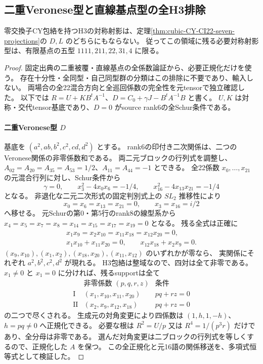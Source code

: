 \subsection{二重Veronese型と直線基点型の全H3排除}
\label{subsec:cubic-CY-DL-cover}
\begin{theorem}\label{thm:cubic-CY-DL-cover-empty}
零交換子CY包絡を持つH3の対称射影は、定理\ref{thm:cubic-CY-CI22-seven-projections}の
$D,L$ のどちらにもならない。
従ってこの領域に残る必要対称射影型は、有限基点の五型 $1111,211,22,31,4$ に限る。
\end{theorem}
\begin{proof}
固定出典\cite{AS4CYpinned}の二重被覆・直線基点の全係数論証から、必要正規化だけを使う。
存在十分性・全同型・自己同型群の分類はこの排除に不要であり、輸入しない。
両場合の全22混合方向と全巡回係数の完全性を元tensorで独立確認した。
以下では $R=U+KB^tA^{-1}$、$D=C_0+\gamma J-B^tA^{-1}B$ と書く。
$U,K$ は対称・交代tensor基底であり、$D=0$ がsource rank6の全Schur条件である。

\paragraph{二重Veronese型 $D$}
基底を $(a^2,ab,b^2,c^2,cd,d^2)$ とする。
rank6の印付き二次関係は、二つのVeronese関係の非零係数和である。
両二元ブロックの行列式を調整し、
$A_{02}=A_{20}=A_{35}=A_{53}=1/2$、$A_{11}=A_{44}=-1$ とできる。
全22係数 $x_0,\ldots,x_{21}$ の元混合行列に対し、Schur条件から
\[
 \gamma=0,\qquad x_3^2-4x_0x_6=-1/4,\qquad
 x_{16}^2-4x_{13}x_{21}=-1/4
\]
となる。
非退化な二元二次形式の固定判別式上の $SL_2$ 推移性により
\[
 x_0=x_6=x_{13}=x_{21}=0,\qquad x_3=x_{16}=i/2
\]
へ移せる。
元Schurの第0・第5行のrank8の線型系から
$x_4=x_5=x_7=x_8=x_{14}=x_{15}=x_{17}=x_{19}=0$ となる。
残る全式は正確に
\[
\begin{gathered}
 x_1x_9=x_2x_{10}=x_{11}x_{18}=x_{12}x_{20}=0,\\
 x_1x_{10}+x_{11}x_{20}=0,\qquad
 x_{12}x_{18}+x_2x_9=0.
\end{gathered}
\]
$(x_9,x_{10}),(x_1,x_2),(x_{18},x_{20}),(x_{11},x_{12})$ のいずれかが零なら、
実関係にそれぞれ $a^2,b^2,c^2,d^2$ が現れる。
H3包絡は整域なので、四対は全て非零である。
$x_1\ne0$ と $x_1=0$ に分ければ、残るsupportは全て
\[
\begin{array}{c|c|c}
 &\text{非零係数 }(p,q,r,z)&\text{条件}\\\hline
\mathrm I&(x_1,x_{10},x_{11},x_{20})&pq+rz=0\\
\mathrm{II}&(x_2,x_9,x_{12},x_{18})&pq+rz=0
\end{array}
\]
の二つで尽くされる。
生成元の対角変更により四係数は $(1,h,1,-h)$、$h=pq\ne0$ へ正規化できる。
必要な根は $R^2=U/p$ 又は $R^4=1/(p^3r)$ だけであり、全分母は非零である。
選んだ対角変更は二ブロックの行列式を等しくするので、正規化した $A$ を保つ。
この全正規化と元16語の関係移送を、多項式恒等式として検証した。


\end{proof}

